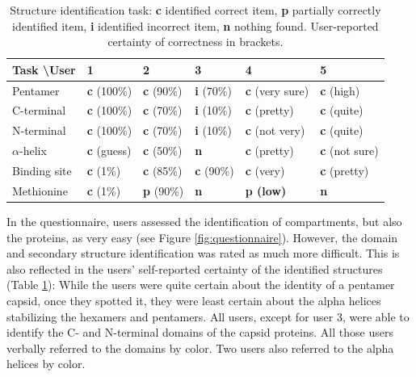 \documentclass{egpubl}
\begin{document}
	
	
\begin{table}
	 	
	 	\centering
	 	\caption{Structure identification task: \textbf{\color{cc}c} identified correct item, \textbf{\color{cp}p} partially correctly identified item, \textbf{\color{ci}i} identified incorrect item, \textbf{\color{cn}n} nothing found. User-reported certainty of correctness in brackets. }
	 	{\scriptsize \begin{tabular}{ l l l l l l }
	 		\toprule
	 		Task \textbackslash User & 1 & 2 & 3 & 4 & 5 \\
	 		\midrule
	 		Pentamer       & \textbf{\color{cc}c} (100\%) 	& \textbf{\color{cc}c} (90\%) 	& \textbf{\color{ci}i} (70\%) 	& \textbf{\color{cc}c} (very sure) 		& \textbf{\color{cc}c} (high)\\
	 		C-terminal     & \textbf{\color{cc}c} (100\%) 	& \textbf{\color{cc}c} (70\%) 	& \textbf{\color{ci}i} (10\%) 		& \textbf{\color{cc}c} (pretty) 	& \textbf{\color{cc}c} (quite) \\
	 		N-terminal     & \textbf{\color{cc}c} (100\%) 	& \textbf{\color{cc}c} (70\%) 	& \textbf{\color{ci}i} (10\%) 		& \textbf{\color{cc}c} (not very) 	& \textbf{\color{cc}c} (quite)\\
	 		$\alpha$-helix & \textbf{\color{cc}c} (guess) 	& \textbf{\color{cc}c} (50\%) 	& \textbf{\color{cn}n} 		& \textbf{\color{cc}c} (pretty) 	& \textbf{\color{cc}c} (not sure) \\
	 		Binding site   & \textbf{\color{cc}c} (1\%) 	& \textbf{\color{cc}c} (85\%) 	& \textbf{\color{cc}c} (90\%) 	& \textbf{\color{cc}c} (very) 		& \textbf{\color{cc}c} (pretty) \\
	 		Methionine      & \textbf{\color{cc}c} (1\%) 	& \textbf{\color{cp}p} (90\%) 	& \textbf{\color{cn}n} 		& \textbf{\color{cp}p (low)} 			& \textbf{\color{cn}n}  \\
	 		\bottomrule
	 	\end{tabular}}
	 	
	 	\label{table:identification}
	 \end{table}
	 
	 In the questionnaire, users assessed the identification of compartments, but also the proteins, as very easy  (see Figure \ref{fig:questionnaire}). 
	 However, the domain and secondary structure identification was rated as much more difficult. 
	 This is also reflected in the users' self-reported certainty of the identified structures (Table \ref{table:identification}): 
	 While the users were quite certain about the identity of a pentamer capsid, once they spotted it, they were least certain about the alpha helices stabilizing the hexamers and pentamers. 
	 All users, except for user 3, were able to identify the C- and N-terminal domains of the capsid proteins. 
	 All those users verbally referred to the domains by color. 
	 Two users also referred to the alpha helices by color. 
	 
\end{document}
